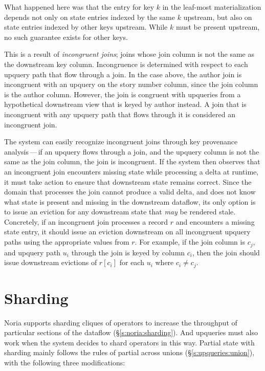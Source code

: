 What happened here was that the entry for key $k$ in the leaf-most
materialization depends not only on state entries indexed by the same $k$
upstream, but also on state entries indexed by other keys upstream. While $k$
must be present upstream, no such guarantee exists for other keys.

This is a result of \textit{incongruent joins}; joins whose join column is not
the same as the downstream key column. Incongruence is determined with respect
to each upquery path that flow through a join. In the case above, the author
join is incongruent with an upquery on the story number column, since the join
column is the author column. However, the join is congruent with upqueries from
a hypothetical downstream view that is keyed by author instead. A join that is
incongruent with any upquery path that flows through it is considered an
incongruent join.

The system can easily recognize incongruent joins through key provenance
analysis\,---\,if an upquery flows through a join, and the upquery column is not
the same as the join column, the join is incongruent. If the system then
observes that an incongruent join encounters missing state while processing a
delta at runtime, it must take action to ensure that downstream state remains
correct. Since the domain that processes the join cannot produce a valid delta,
and does not know what state is present and missing in the downstream dataflow,
its only option is to issue an eviction for any downstream state that \emph{may}
be rendered stale. Concretely, if an incongruent join processes a record $r$ and
encounters a missing state entry, it should issue an eviction downstream on all
incongruent upquery paths using the appropriate values from $r$. For example, if
the join column is $c_j$, and upquery path $u_i$ through the join is keyed by
column $c_i$, then the join should issue downstream evictions of $r[c_i]$ for
each $u_i$ where $c_i \neq c_j$.

\section{Sharding}

Noria supports sharding cliques of operators to increase the throughput of
particular sections of the dataflow (\S\ref{s:noria:sharding}). And upqueries
must also work when the system decides to shard operators in this way. Partial
state with sharding mainly follows the rules of partial across unions
(\S\ref{s:upqueries:union}), with the following three modifications:

